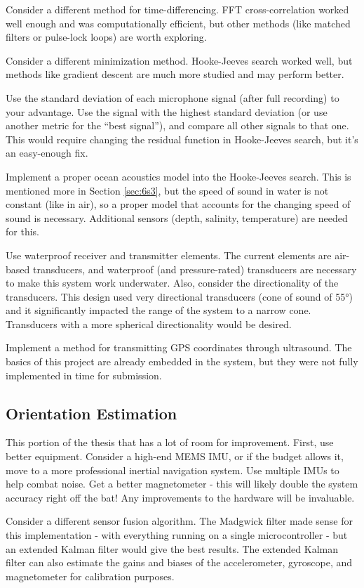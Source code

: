 \documentclass[12pt,a4paper]{report}
\begin{document}
Consider a different method for time-differencing. FFT cross-correlation worked well enough and was computationally efficient, but other methods (like matched filters or pulse-lock loops) are worth exploring.

Consider a different minimization method. Hooke-Jeeves search worked well, but methods like gradient descent are much more studied and may perform better.

Use the standard deviation of each microphone signal (after full recording) to your advantage. Use the signal with the highest standard deviation (or use another metric for the “best signal”), and compare all other signals to that one. This would require changing the residual function in Hooke-Jeeves search, but it’s an easy-enough fix.

Implement a proper ocean acoustics model into the Hooke-Jeeves search. This is mentioned more in Section \ref{sec:6s3}, but the speed of sound in water is not constant (like in air), so a proper model that accounts for the changing speed of sound is necessary. Additional sensors (depth, salinity, temperature) are needed for this.

Use waterproof receiver and transmitter elements. The current elements are air-based transducers, and waterproof (and pressure-rated) transducers are necessary to make this system work underwater. Also, consider the directionality of the transducers. This design used very directional transducers (cone of sound of 55°) and it significantly impacted the range of the system to a narrow cone. Transducers with a more spherical directionality would be desired.

Implement a method for transmitting GPS coordinates through ultrasound. The basics of this project are already embedded in the system, but they were not fully implemented in time for submission.

\subsection{Orientation Estimation} \label{sec:7s1s4}
This portion of the thesis that has a lot of room for improvement. First, use better equipment. Consider a high-end MEMS IMU, or if the budget allows it, move to a more professional inertial navigation system. Use multiple IMUs to help combat noise. Get a better magnetometer - this will likely double the system accuracy right off the bat! Any improvements to the hardware will be invaluable.

Consider a different sensor fusion algorithm. The Madgwick filter made sense for this implementation - with everything running on a single microcontroller - but an extended Kalman filter would give the best results. The extended Kalman filter can also estimate the gains and biases of the accelerometer, gyroscope, and magnetometer for calibration purposes.
\end{document}
